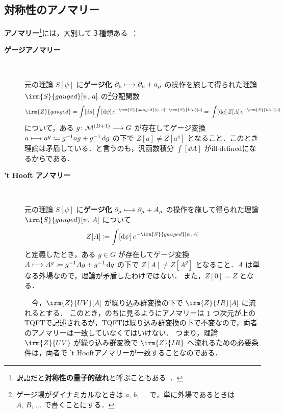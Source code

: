 \documentclass[TQFT_main]{subfiles}
\begin{document}
\subsection{対称性のアノマリー}


\textbf{アノマリー}\footnote{訳語だと\textbf{対称性の量子的破れ}と呼ぶこともある~\cite{Fujikawa2001path}．}には，大別して３種類ある~\cite{Kawahira2024anomaly}：
\begin{description}
    \item[\textbf{ゲージアノマリー}]　

    元の理論 $S[\psi]$ に\textbf{ゲージ化} $\partial_\mu \longmapsto \partial_\mu + a_\mu$ の操作を施して得られた理論 $\irm{S}{gauged}[\psi,\, a]$ の\footnote{ゲージ場がダイナミカルなときは $a,\, b,\, \dots$ で，単に外場であるときは $A,\, B,\, \dots$ で書くことにする．}分配関数
    \begin{align}
        \irm{Z}{gauged} = \int [\dd{a}] \int [\dd{\psi}]\, e^{-\irm{S}{gauged}[\psi,\, a] - \irm{S}{kin} [a]} \eqqcolon \int [\dd{a}]\, Z[A]\, e^{-\irm{S}{kin}[a]}
    \end{align}
    について，ある $g \colon \mathcal{M}^{(D+1)} \longrightarrow G$ が存在してゲージ変換 $a \longmapsto a^g \coloneqq g^{-1} a g + g^{-1} \dd{g}$ の下で $Z[a] \neq Z[a^g]$ となること．このとき理論は矛盾している．と言うのも，汎函数積分 $\int [\dd{A}]$ がill-definedになるからである．

    \item[\textbf{'t Hooft アノマリー}]　
    
    元の理論 $S[\psi]$ に\textbf{ゲージ化} $\partial_\mu \longmapsto \partial_\mu + A_\mu$ の操作を施して得られた理論 $\irm{S}{gauged}[\psi,\, A]$ について
    \begin{align}
        Z[A] \coloneqq \int [\dd{\psi}]\, e^{-\irm{S}{gauged}[\psi,\, A]}
    \end{align}
    と定義したとき，ある $g \in G$ が存在してゲージ変換 $A \longmapsto A^g \coloneqq g^{-1} Ag + g^{-1} \dd{g}$ の下で $Z[A] \neq Z[A^g]$ となること．$A$ は単なる外場なので，理論が矛盾したわけではない．
    また，$Z[0] = Z$ となる．

    　今，$\irm{Z}{UV}[A]$ が繰り込み群変換の下で $\irm{Z}{IR}[A]$ に流れるとする．
    このとき，のちに見るようにアノマリーは $1$ つ次元が上のTQFTで記述されるが，TQFTは繰り込み群変換の下で不変なので，両者のアノマリーは一致していなくてはいけない．
    つまり，理論 $\irm{Z}{UV}$ が繰り込み群変換で $\irm{Z}{IR}$ へ流れるための必要条件は，両者で 't Hooftアノマリーが一致することなのである．


\end{description}
\end{document}
